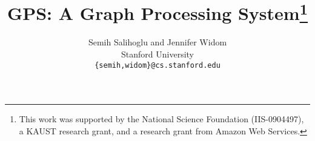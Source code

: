 \documentclass[12pt]{article}
\title{GPS: A Graph Processing System\thanks{This work was supported by the National Science Foundation (IIS-0904497), a KAUST research grant, and a research grant from Amazon Web Services.}}
\author{
Semih Salihoglu and Jennifer Widom\\[2mm]
       Stanford University\\[1mm]
       {\tt \{semih,widom\}@cs.stanford.edu}
}
\begin{document}
\date{}

\maketitle














 
\end{document}
